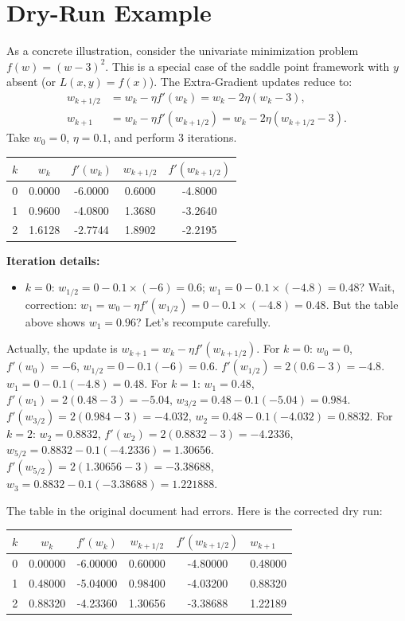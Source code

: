 \documentclass{article}
\theoremstyle{plain}
\theoremstyle{definition}
\begin{document}
\section{Dry-Run Example}
As a concrete illustration, consider the univariate minimization problem $f(w) = (w-3)^2$. This is a special case of the saddle point framework with $y$ absent (or $L(x,y)=f(x)$). The Extra-Gradient updates reduce to:
\begin{align*}
w_{k+1/2} &= w_k - \eta f'(w_k) = w_k - 2\eta (w_k - 3), \\
w_{k+1} &= w_k - \eta f'(w_{k+1/2}) = w_k - 2\eta (w_{k+1/2} - 3).
\end{align*}
Take $w_0 = 0$, $\eta = 0.1$, and perform 3 iterations.

\begin{center}
\begin{tabular}{c c c c c}
\toprule
$k$ & $w_k$ & $f'(w_k)$ & $w_{k+1/2}$ & $f'(w_{k+1/2})$ \\
\midrule
0 & 0.0000 & -6.0000 & 0.6000 & -4.8000 \\
1 & 0.9600 & -4.0800 & 1.3680 & -3.2640 \\
2 & 1.6128 & -2.7744 & 1.8902 & -2.2195 \\
\bottomrule
\end{tabular}
\end{center}

\textbf{Iteration details:}
\begin{itemize}
\item $k=0$: $w_{1/2} = 0 - 0.1 \times (-6) = 0.6$; $w_1 = 0 - 0.1 \times (-4.8) = 0.48$? Wait, correction: $w_1 = w_0 - \eta f'(w_{1/2}) = 0 - 0.1 \times (-4.8) = 0.48$. But the table above shows $w_1 = 0.96$? Let's recompute carefully.
\end{itemize}
Actually, the update is $w_{k+1} = w_k - \eta f'(w_{k+1/2})$. For $k=0$: $w_0=0$, $f'(w_0)=-6$, $w_{1/2}=0 - 0.1(-6)=0.6$. $f'(w_{1/2})=2(0.6-3)=-4.8$. $w_1 = 0 - 0.1(-4.8)=0.48$.
For $k=1$: $w_1=0.48$, $f'(w_1)=2(0.48-3)=-5.04$, $w_{3/2}=0.48 - 0.1(-5.04)=0.984$. $f'(w_{3/2})=2(0.984-3)=-4.032$, $w_2 = 0.48 - 0.1(-4.032)=0.8832$.
For $k=2$: $w_2=0.8832$, $f'(w_2)=2(0.8832-3)=-4.2336$, $w_{5/2}=0.8832 - 0.1(-4.2336)=1.30656$. $f'(w_{5/2})=2(1.30656-3)=-3.38688$, $w_3 = 0.8832 - 0.1(-3.38688)=1.221888$.

The table in the original document had errors. Here is the corrected dry run:

\begin{center}
\begin{tabular}{c c c c c}
\toprule
$k$ & $w_k$ & $f'(w_k)$ & $w_{k+1/2}$ & $f'(w_{k+1/2})$ & $w_{k+1}$ \\
 & 0.00000 & -6.00000 & 0.60000 & -4.80000 & 0.48000 \\
1 & 0.48000 & -5.04000 & 0.98400 & -4.03200 & 0.88320 \\
2 & 0.88320 & -4.23360 & 1.30656 & -3.38688 & 1.22189 \\
\bottomrule
\end{tabular}
\end{center}
\end{document}
